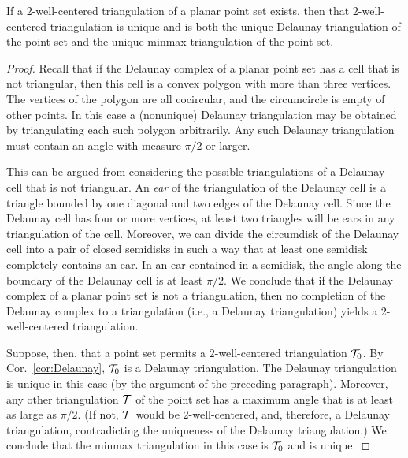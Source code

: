 \documentclass[final]{siamltex}
\begin{document}
\begin{theorem}
\label{thm:uniquewct}
If a $2$-well-centered triangulation of a planar point set exists,
then that $2$-well-centered triangulation is unique and is both the
unique Delaunay triangulation of the point set and the unique minmax
triangulation of the point set.
\end{theorem}
\begin{proof}
Recall that if the Delaunay complex of a planar point set has a cell
  that is not triangular, then this cell is a convex polygon with more
  than three vertices.  The vertices of the polygon are all
  cocircular, and the circumcircle is empty of other points.  In this
  case a (nonunique) Delaunay triangulation may be obtained by
  triangulating each such polygon arbitrarily.  Any such Delaunay
  triangulation must contain an angle with measure $\pi/2$ or larger.

  This can be argued from considering the possible triangulations of a
  Delaunay cell that is not triangular.
An {\emph{ear}} of the triangulation of the Delaunay cell is a
  triangle bounded by one diagonal and two edges of the Delaunay cell.
  Since the Delaunay cell has four or more
  vertices, 
at least two triangles will be ears in any triangulation of the
  cell.  Moreover, we can divide the circumdisk of the Delaunay cell
  into a pair of
closed semidisks in such a way that at least one semidisk completely
  contains an ear.  In an ear contained in a semidisk, the angle along the boundary of
  the Delaunay cell is at least $\pi/2$.  We conclude that if the
  Delaunay complex of a planar point set is not a triangulation, then
  no completion of the Delaunay complex to a triangulation (i.e., a
  Delaunay triangulation) yields a $2$-well-centered triangulation.



Suppose, then, that a point set permits a $2$-well-centered
triangulation $\mathcal{T}_{0}$.  By Cor.~\ref{cor:Delaunay}, $\mathcal{T}_{0}$
is a Delaunay triangulation.  The Delaunay triangulation is unique in
this case (by the argument of the preceding paragraph).  Moreover, any
other triangulation $\mathcal{T}$ of the point set has a maximum angle that
is at least as large as $\pi/2$.  (If not, $\mathcal{T}$ would be
$2$-well-centered, and, therefore, a Delaunay triangulation,
contradicting the uniqueness of the Delaunay triangulation.)  We
conclude that the minmax triangulation in this case is $\mathcal{T}_{0}$
and is unique.
\end{proof}

\bigskip
\end{document}
